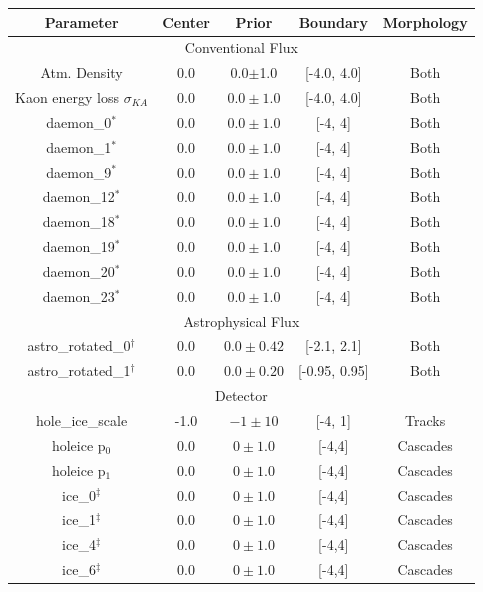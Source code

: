 \documentclass[main.tex]{subfiles}
\begin{document}
\begin{table}
    \centering
    \begin{tabular}{c | cccc}\rowcolor{blue!25}
        {\large \textbf{Parameter}} & {\large \textbf{Center}} & {\large \textbf{Prior}} & {\large \textbf{Boundary}}& {\large \textbf{Morphology}} \\ \hline
        \multicolumn{5}{c}{Conventional Flux} \\\hline
        Atm. Density & 0.0 & 0.0$\pm$1.0 & [-4.0, 4.0] & Both\\
        Kaon energy loss $\sigma_{KA}$ & 0.0 & $0.0\pm1.0$ & [-4.0, 4.0]& Both \\
        daemon\_0$^{*}$  & 0.0 & $0.0\pm1.0$ & [-4, 4]& Both\\
        daemon\_1$^{*}$  & 0.0 & $0.0\pm1.0$ & [-4, 4]& Both\\
        daemon\_9$^{*}$  & 0.0 & $0.0\pm1.0$ & [-4, 4]& Both\\
        daemon\_12$^{*}$  & 0.0 & $0.0\pm1.0$ & [-4, 4]& Both\\
        daemon\_18$^{*}$ & 0.0 & $0.0\pm1.0$ & [-4, 4]& Both\\
        daemon\_19$^{*}$ & 0.0 & $0.0\pm1.0$ & [-4, 4]& Both\\
        daemon\_20$^{*}$ & 0.0 & $0.0\pm1.0$ & [-4, 4]& Both\\
        daemon\_23$^{*}$ & 0.0 & $0.0\pm1.0$ & [-4, 4]& Both\\
        \multicolumn{5}{c}{Astrophysical Flux} \\\hline
        astro\_rotated\_0$^{\dag}$ & 0.0 & $0.0\pm 0.42 $ & [-2.1, 2.1]&Both\\
        astro\_rotated\_1$^{\dag}$ & 0.0 & $0.0\pm0.20$ & [-0.95, 0.95]&Both\\
        \multicolumn{5}{c}{Detector} \\\hline
        hole\_ice\_scale & -1.0 & $-1\pm10$ & [-4, 1]&Tracks \\
        holeice p$_{0}$ & 0.0 & $0\pm 1.0$ & [-4,4]&Cascades\\
        holeice p$_{1}$ & 0.0 & $0\pm 1.0$ & [-4,4]&Cascades\\
        ice\_0$^{\ddag}$ & 0.0 & $0\pm 1.0$ & [-4,4]&Cascades\\
        ice\_1$^{\ddag}$ & 0.0 & $0\pm 1.0$ & [-4,4]&Cascades\\
        ice\_4$^{\ddag}$ & 0.0 & $0\pm 1.0$ & [-4,4]&Cascades\\
        ice\_6$^{\ddag}$ & 0.0 & $0\pm 1.0$ & [-4,4]&Cascades\\

\end{tabular}
\end{table}
\end{document}

